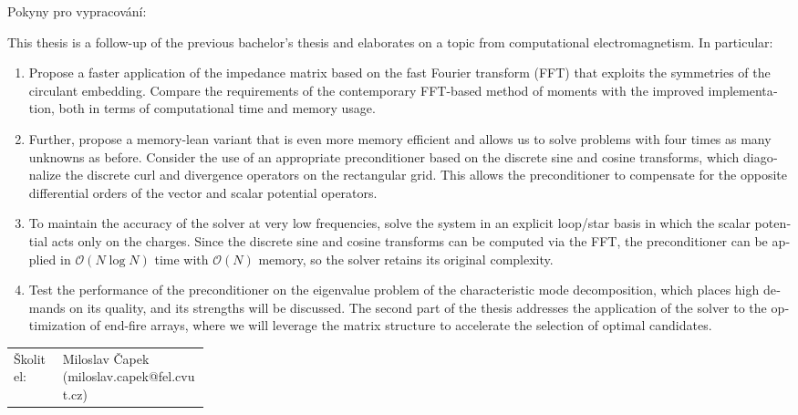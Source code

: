 \documentclass[11pt, a4paper]{article}
\makeatletter
\newcommand{\skolitel}{Miloslav Čapek (miloslav.capek@fel.cvut.cz)}
\makeatother
\begin{document}
Pokyny pro vypracování: \\[0.5ex]
\begin{otherlanguage}{english}
	This thesis is a follow-up of the previous bachelor's thesis and elaborates on a topic from computational electromagnetism. In particular:
	\begin{enumerate}
		\item Propose a faster application of the impedance matrix based on the fast Fourier transform (FFT) that exploits the symmetries of the circulant embedding. Compare the requirements of the contemporary FFT-based method of moments with the improved implementation, both in terms of computational time and memory usage.
		\item Further, propose a memory-lean variant that is even more memory efficient and allows us to solve problems with four times as many unknowns as before. Consider the use of an appropriate preconditioner based on the discrete sine and cosine transforms, which diagonalize the discrete curl and divergence operators on the rectangular grid. This allows the preconditioner to compensate for the opposite differential orders of the vector and scalar potential operators. 
		\item To maintain the accuracy of the solver at very low frequencies, solve the system in an explicit loop/star basis in which the scalar potential acts only on the charges. Since the discrete sine and cosine transforms can be computed via the FFT, the preconditioner can be applied in $\mathcal{O}(N \log N)$ time with $\mathcal{O}(N)$ memory, so the solver retains its original complexity. 
		\item Test the performance of the preconditioner on the eigenvalue problem of the characteristic mode decomposition, which places high demands on its quality, and its strengths will be discussed. The second part of the thesis addresses the application of the solver to the optimization of end-fire arrays, where we will leverage the matrix structure to accelerate the selection of optimal candidates.
	\end{enumerate}
\end{otherlanguage}

\vspace{2ex}

\begin{tabularx}{\linewidth}{@{} p{0.25\linewidth} X @{}}
    Školitel: & \skolitel
\end{tabularx}

\vspace{2ex}
\end{document}

